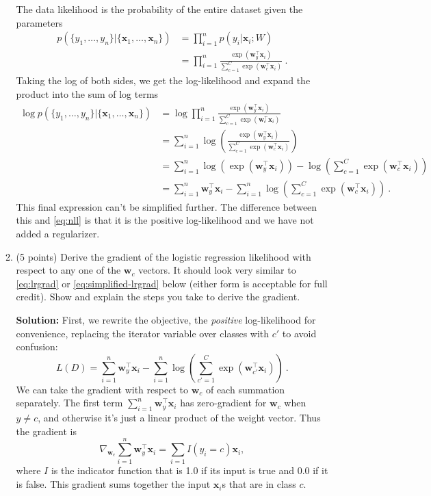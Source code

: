 \documentclass[10pt]{article}
\newcommand{\bx}{{\boldsymbol x}}
\newcommand{\bw}{{\boldsymbol w}}
\newcommand{\solution}[1]{{\color{PineGreen} \textbf{Solution:} #1}}
\begin{document}
\begin{enumerate}
\begin{enumerate}
{The data likelihood is the probability of the entire dataset given the parameters
\begin{equation}
\begin{aligned}
p(\{y_1, \ldots, y_n\} | \{\bx_1, \ldots, \bx_n\}) &= \prod_{i = 1}^n p(y_i | \bx_i; W)\\
&= \prod_{i = 1}^n \frac{\exp(\bw_y^\top \bx_i)}{\sum_{c = 1}^C \exp(\bw_c^\top \bx_i)}~.
\end{aligned}
\end{equation}
Taking the log of both sides, we get the log-likelihood and expand the product into the sum of log terms
\begin{equation}
\begin{aligned}
\log p(\{y_1, \ldots, y_n\} | \{\bx_1, \ldots, \bx_n\}) &= \log \prod_{i = 1}^n \frac{\exp(\bw_y^\top \bx_i)}{\sum_{c = 1}^C \exp(\bw_c^\top \bx_i)}\\
&= \sum_{i = 1}^n \log \left( \frac{\exp(\bw_y^\top \bx_i)}{\sum_{c = 1}^C \exp(\bw_c^\top \bx_i)} \right) \\
&= \sum_{i = 1}^n \log \left(\exp(\bw_y^\top \bx_i)\right) - \log \left( \sum_{c = 1}^C \exp(\bw_c^\top \bx_i) \right) \\
&= \sum_{i = 1}^n \bw_y^\top \bx_i - \sum_{i = 1}^n \log \left( \sum_{c = 1}^C \exp(\bw_c^\top \bx_i) \right) ~.
\end{aligned}
\end{equation}
This final expression can't be simplified further. The difference between this and \cref{eq:nll} is that it is the positive log-likelihood and we have not added a regularizer.
}

\item (5 points) Derive the gradient of the logistic regression likelihood with respect to any one of the $\bw_c$ vectors. It should look very similar to \cref{eq:lrgrad} or \cref{eq:simplified-lrgrad} below (either form is acceptable for full credit). Show and explain the steps you take to derive the gradient.

\solution{
First, we rewrite the objective, the \textit{positive} log-likelihood for convenience, replacing the iterator variable over classes with $c'$ to avoid confusion:
\[
L(D) = \sum_{i = 1}^n \bw_y^\top \bx_i - \sum_{i = 1}^n \log \left( \sum_{c' = 1}^C \exp(\bw_{c'}^\top \bx_i) \right)~.
\]
We can take the gradient with respect to $\bw_c$ of each summation separately. The first term $\sum_{i = 1}^n \bw_y^\top \bx_i$ has zero-gradient for $\bw_c$ when $y \neq c$, and otherwise it's just a linear product of the weight vector. Thus the gradient is
\[
\nabla_{\bw_c} \sum_{i = 1}^n \bw_y^\top \bx_i = \sum_{i = 1} I(y_i = c) \bx_i,
\]
where $I$ is the indicator function that is 1.0 if its input is true and 0.0 if it is false. This gradient sums together the input $\bx_i$s that are in class $c$. 

}
\end{enumerate}
\end{enumerate}
\end{document}
